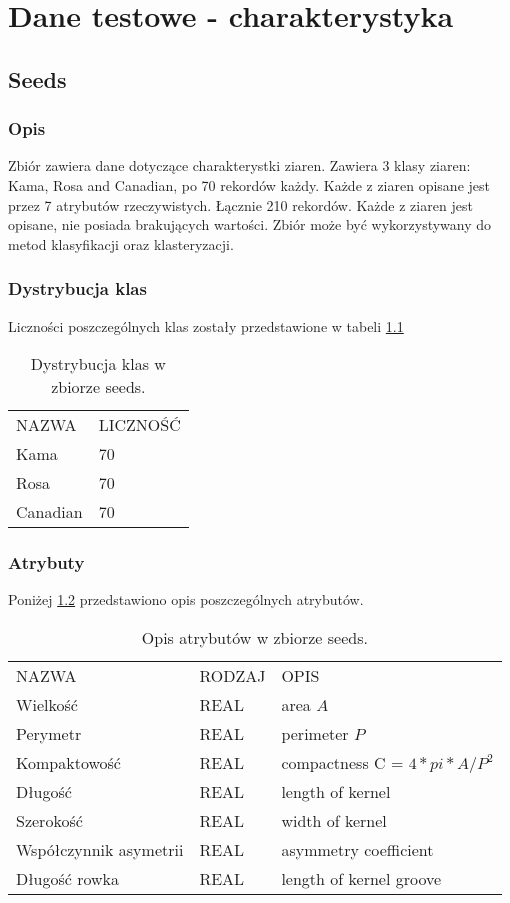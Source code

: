 \chapter{Dane testowe - charakterystyka}

\section{Seeds}
	\subsection{Opis}
Zbiór zawiera dane dotyczące charakterystki ziaren. Zawiera 3 klasy ziaren: Kama, Rosa and Canadian, po 70 rekordów każdy. Każde z ziaren opisane jest przez 7 atrybutów rzeczywistych. Łącznie 210 rekordów. Każde z ziaren jest opisane, nie posiada brakujących wartości. Zbiór może być wykorzystywany do metod klasyfikacji oraz klasteryzacji.
	\subsection{Dystrybucja klas}
Liczności poszczególnych klas zostały przedstawione w tabeli \ref{dist-seeds}
\begin{table}[H]
\centering
\caption{Dystrybucja klas w zbiorze seeds.}
\label{dist-seeds}
\begin{tabular}{ll}
NAZWA    & LICZNOŚĆ \\
Kama     & 70       \\
Rosa     & 70       \\
Canadian & 70      
\end{tabular}
\end{table}
	\subsection{Atrybuty}
	Poniżej \ref{attr-seeds} przedstawiono opis poszczególnych atrybutów.
\begin{table}[H]
\centering
\caption{Opis atrybutów w zbiorze seeds.}
\label{attr-seeds}
\begin{tabular}{lll}
NAZWA    	& RODZAJ & OPIS \\
Wielkość	& REAL	& area $A$\\
Perymetr	& REAL & perimeter $P$\\
Kompaktowość & REAL & compactness C = $4*pi*A/P^2$\\
Długość		& REAL & length of kernel\\
Szerokość	& REAL & width of kernel\\
Współczynnik asymetrii	& REAL & asymmetry coefficient\\
Długość rowka			& REAL & length of kernel groove 
\end{tabular}
\end{table}

